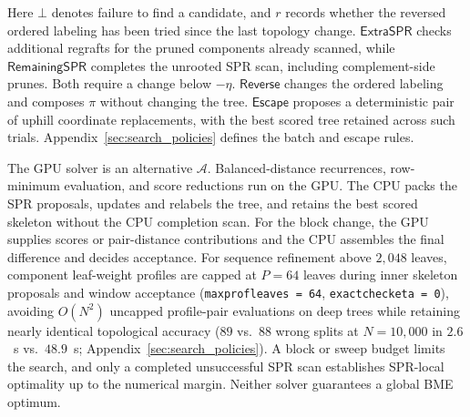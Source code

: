 \documentclass[11pt,a4paper]{article}
\makeatletter
\newcommand{\proc}[1]{\mathsf{#1}}
\DeclareRobustCommand{\_}{\ifmmode\nfss@text{\textunderscore}\else\textunderscore\allowbreak\fi}
\theoremstyle{definition}
\makeatother
\begin{document}
Here $\bot$ denotes failure to find a candidate, and $r$ records whether the reversed ordered labeling has been tried since the last topology change.
$\proc{ExtraSPR}$ checks additional regrafts for the pruned components already scanned, while $\proc{RemainingSPR}$ completes the unrooted SPR scan, including complement-side prunes.
Both require a change below $-\eta$.
$\proc{Reverse}$ changes the ordered labeling and composes $\pi$ without changing the tree.
$\proc{Escape}$ proposes a deterministic pair of uphill coordinate replacements, with the best scored tree retained across such trials.
Appendix~\ref{sec:search_policies} defines the batch and escape rules.

The GPU solver is an alternative $\mathcal A$.
Balanced-distance recurrences, row-minimum evaluation, and score reductions run on the GPU.
The CPU packs the SPR proposals, updates and relabels the tree, and retains the best scored skeleton without the CPU completion scan.
For the block change, the GPU supplies scores or pair-distance contributions and the CPU assembles the final difference and decides acceptance.
For sequence refinement above $2{,}048$ leaves, component leaf-weight profiles are capped at $P=64$ leaves during inner skeleton proposals and window acceptance (\texttt{max\_prof\_leaves = 64}, \texttt{exact\_check\_eta = 0}), avoiding $O(N^2)$ uncapped profile-pair evaluations on deep trees while retaining nearly identical topological accuracy ($89$ vs.\ $88$ wrong splits at $N=10{,}000$ in $2.6$~s vs.\ $48.9$~s; Appendix~\ref{sec:search_policies}).
A block or sweep budget limits the search, and only a completed unsuccessful SPR scan establishes SPR-local optimality up to the numerical margin.
Neither solver guarantees a global BME optimum.
\end{document}
